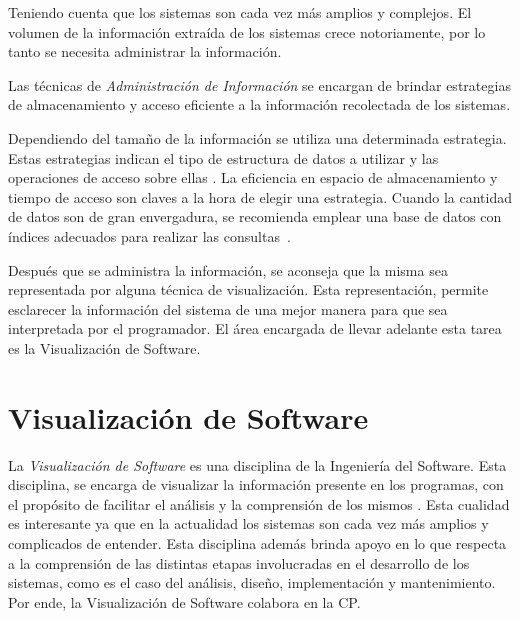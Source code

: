 Teniendo cuenta que los sistemas son cada vez más amplios y complejos. El volumen de la información extraída de los sistemas crece notoriamente, por lo tanto se necesita administrar la información.

Las técnicas de \textit{Administración de Información} se encargan de brindar estrategias de almacenamiento y acceso eficiente a la información recolectada de los sistemas. 

Dependiendo del tamaño de la información se utiliza una determinada estrategia. Estas estrategias indican el tipo de estructura de datos a utilizar y las operaciones de acceso sobre ellas \cite{AAJU83,TSTA80}. La eficiencia en espacio de almacenamiento y tiempo de acceso son claves a la hora de elegir una estrategia.
Cuando la cantidad de datos son de gran envergadura, se recomienda emplear una base de datos con índices adecuados para realizar las \mbox{consultas \cite{ERNS99}.}

Después que se administra la información, se aconseja que la misma sea representada por alguna técnica de visualización. Esta representación, permite esclarecer la información del sistema de una mejor manera para que sea interpretada por el programador. El área encargada de llevar adelante esta tarea es la Visualización de Software.



\section{Visualización de Software}

La \textit{Visualización de Software} es una disciplina de la Ingeniería del Software. Esta disciplina, se encarga de visualizar la información presente en los programas, con el propósito de facilitar el análisis y la comprensión de los mismos \cite{TBSE96,TARCM09,LWELP02,PMQUE06}. Esta cualidad es interesante ya que en la actualidad los sistemas son cada vez más amplios y complicados de entender. Esta disciplina además brinda apoyo en lo que respecta a la comprensión de las distintas etapas involucradas en el desarrollo de los sistemas, como es el caso del análisis, diseño, implementación y mantenimiento. Por ende, la Visualización de Software colabora en la CP.

